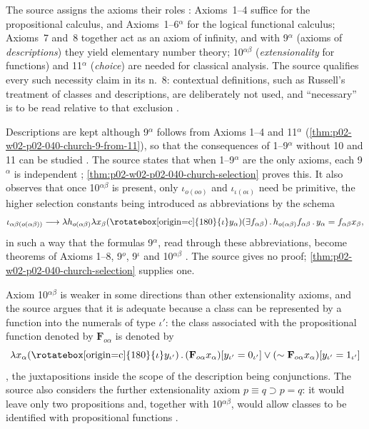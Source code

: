 The source assigns the axioms their roles \cite[\S4, pp.~61--62]{Church1940}:
Axioms~1--4 suffice for the propositional calculus, and Axioms~1--6\(^\alpha\)
for the logical functional calculus; Axioms~7 and~8 together act as an axiom
of infinity, and with 9\(^\alpha\) (axioms of \emph{descriptions}) they yield
elementary number theory; 10\(^{\alpha\beta}\) (\emph{extensionality} for
functions) and 11\(^\alpha\) (\emph{choice}) are needed for classical
analysis.  The source qualifies every such necessity claim in its n.~8:
contextual definitions, such as Russell's treatment of classes and
descriptions, are deliberately not used, and ``necessary'' is to be read
relative to that exclusion \cite[\S4, p.~61, n.~8]{Church1940}.

Descriptions are kept although 9\(^\alpha\) follows from Axioms 1--4 and
11\(^\alpha\) (\cref{thm:p02-w02-p02-040-church-9-from-11}), so that the
consequences of 1--9\(^\alpha\) without 10 and 11 can be studied
\cite[\S4, pp.~61--62]{Church1940}.  The source states that when 1--9\(^\alpha\)
are the only axioms, each 9\(^\alpha\) is independent
\cite[\S4, p.~62]{Church1940}; \cref{thm:p02-w02-p02-040-church-selection}
proves this.  It also observes that once 10\(^{\alpha\beta}\) is present,
only \(\iota_{o(oo)}\) and \(\iota_{\iota(o\iota)}\) need be primitive, the
higher selection constants being introduced as abbreviations by the schema
\[
 \iota_{\alpha\beta(o(\alpha\beta))}\longrightarrow
 \lambda h_{o(\alpha\beta)}\lambda x_\beta
 (\text{\rotatebox[origin=c]{180}{\(\iota\)}}y_\alpha)(\exists f_{\alpha\beta})\,.\,
 h_{o(\alpha\beta)}f_{\alpha\beta}\,.\,y_\alpha=f_{\alpha\beta}x_\beta,
\]
in such a way that the formulas 9\(^\alpha\), read through these
abbreviations, become theorems of Axioms 1--8, 9\(^o\), 9\(^\iota\) and
10\(^{\alpha\beta}\) \cite[\S4, p.~62]{Church1940}.  The source gives no proof;
\cref{thm:p02-w02-p02-040-church-selection} supplies one.

Axiom 10\(^{\alpha\beta}\) is weaker in some directions than other
extensionality axioms, and the source argues that it is adequate because a
class can be represented by a function into the numerals of type
\(\iota'\): the class associated with the propositional function denoted by
\(\mathbf F_{o\alpha}\) is denoted by
\[
 \lambda x_\alpha(\text{\rotatebox[origin=c]{180}{\(\iota\)}}y_{\iota'})\,.\,
 (\mathbf F_{o\alpha}x_\alpha)[y_{\iota'}=0_{\iota'}]\vee
 (\sim\mathbf F_{o\alpha}x_\alpha)[y_{\iota'}=1_{\iota'}]
\]
\cite[\S4, p.~61]{Church1940}, the juxtapositions inside the scope of the
description being conjunctions.  The source also considers the further
extensionality axiom \(p\equiv q\supset p=q\): it would leave only two
propositions and, together with 10\(^{\alpha\beta}\), would allow classes to
be identified with propositional functions \cite[\S4, p.~61]{Church1940}.

